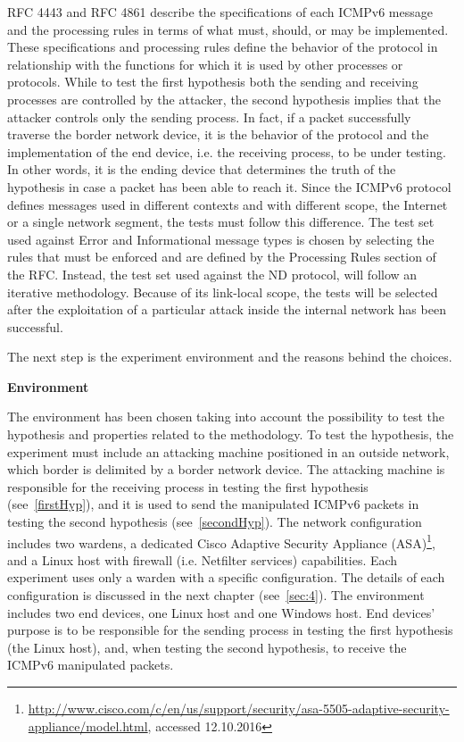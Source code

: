 \documentclass[12pt]{article}
\begin{document}
RFC 4443 and RFC 4861 describe the specifications of each ICMPv6 message and the processing rules in terms of what must, should, or may be implemented. These specifications and processing rules define the behavior of the protocol in relationship with the functions for which it is used by other processes or protocols. While to test the first hypothesis both the sending and receiving processes are controlled by the attacker, the second hypothesis implies that the attacker controls only the sending process. In fact, if a packet successfully traverse the border network device, it is the behavior of the protocol and the implementation of the end device, i.e. the receiving process, to be under testing. In other words, it is the ending device that determines the truth of the hypothesis in case a packet has been able to reach it. Since the ICMPv6 protocol defines messages used in different contexts and with different scope, the Internet or a single network segment, the tests must follow this difference. The test set used against Error and Informational message types is chosen by selecting the rules that must be enforced and are defined by the Processing Rules section of the RFC. Instead, the test set used against the ND protocol, will follow an iterative methodology. Because of its link-local scope, the tests will be selected after the exploitation of a particular attack inside the internal network has been successful.

The next step is the experiment environment and the reasons behind the choices.

\textbf{Environment}
\label{subsub:enviroment}

The environment has been chosen taking into account the possibility to test the hypothesis and properties related to the methodology. To test the hypothesis, the experiment must include an attacking machine positioned in an outside network, which border is delimited by a border network device. The attacking machine is responsible for the receiving process in testing the first hypothesis (see~\ref{firstHyp}), and it is used to send the manipulated ICMPv6 packets in testing the second hypothesis (see~\ref{secondHyp}). The network configuration includes two wardens, a dedicated Cisco Adaptive Security Appliance (ASA)\footnote{\url{http://www.cisco.com/c/en/us/support/security/asa-5505-adaptive-security-appliance/model.html}, accessed 12.10.2016}, and a Linux host with firewall (i.e. Netfilter services) capabilities. Each experiment uses only a warden with a specific configuration. The details of each configuration is discussed in the next chapter (see~\cref{sec:4}). The environment includes two end devices, one Linux host and one Windows host. End devices' purpose is to be responsible for the sending process in testing the first hypothesis (the Linux host), and, when testing the second hypothesis, to receive the ICMPv6 manipulated packets.
\end{document}
